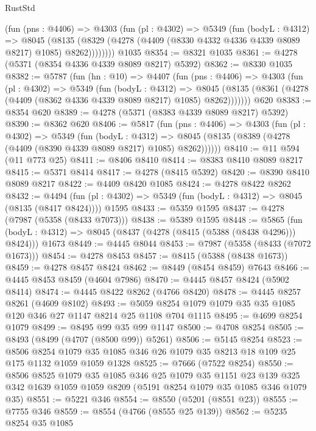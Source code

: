 \begin{lexlean}{RustStd}
\begin{coremodule}
{\begin{coremodule}
{{{{{{{{{{{{{{{{{{{{{{{{{{{{{{{{{{{        (fun (pns : @4406) =>
        @4303
          (fun (pl : @4302) =>
          @5349
            (fun (bodyL : @4312) =>
            @8045
              (@8135 (@8329 (@4278 (@4409 (@8330 @4332 @4336 @4339 @8089 @8217) @1085) @8262))))))))
    @1035
@8354 := @8321 @1035
@8361 := @4278 (@5371 (@8354 @4336 @4339 @8089 @8217) @5392)
@8362 := @8330 @1035
@8382 := @5787
    (fun (hn : @10) =>
    @4407
      (fun (pns : @4406) =>
      @4303
        (fun (pl : @4302) =>
        @5349
          (fun (bodyL : @4312) =>
          @8045 (@8135 (@8361 (@4278 (@4409 (@8362 @4336 @4339 @8089 @8217) @1085) @8262)))))))
    @620
@8383 := @8354 @620
@8389 := @4278 (@5371 (@8383 @4339 @8089 @8217) @5392)
@8390 := @8362 @620
@8406 := @5817
    (fun (pns : @4406) =>
    @4303
      (fun (pl : @4302) =>
      @5349
        (fun (bodyL : @4312) =>
        @8045 (@8135 (@8389 (@4278 (@4409 (@8390 @4339 @8089 @8217) @1085) @8262))))))
@8410 := @11 @594 (@11 @773 @25)
@8411 := @8406 @8410
@8414 := @8383 @8410 @8089 @8217
@8415 := @5371 @8414
@8417 := @4278 (@8415 @5392)
@8420 := @8390 @8410 @8089 @8217
@8422 := @4409 @8420 @1085
@8424 := @4278 @8422 @8262
@8432 := @4494
    (fun (pl : @4302) => @5349 (fun (bodyL : @4312) => @8045 (@8135 (@8417 @8424))))
    @1595
@8433 := @5359 @1595
@8437 := @4278 (@7987 (@5358 (@8433 @7073)))
@8438 := @5389 @1595
@8448 := @5865
    (fun (bodyL : @4312) => @8045 (@8437 (@4278 (@8415 (@5388 (@8438 @4296))) @8424)))
    @1673
@8449 := @4445 @8044
@8453 := @7987 (@5358 (@8433 (@7072 @1673)))
@8454 := @4278 @8453
@8457 := @8415 (@5388 (@8438 @1673))
@8459 := @4278 @8457 @8424
@8462 := @8449 (@8454 @8459) @7643
@8466 := @4445 @8453 @8459 (@4604 @7986)
@8470 := @4445 @8457 @8424 (@5902 @8414)
@8474 := @4445 @8422 @8262 (@4766 @8420)
@8478 := @4445 @8257 @8261 (@4609 @8102)
@8493 := @5059 @8254 @1079 @1079 @35 @35 @1085 @120 @346 @27 @1147 @8214 @25 @1108 @704 @1115
@8495 := @4699 @8254 @1079
@8499 := @8495 @99 @35 @99 @1147
@8500 := @4708 @8254
@8505 := @8493 (@8499 (@4707 (@8500 @99)) @5261)
@8506 := @5145 @8254
@8523 := @8506
    @8254
    @1079
    @35
    @1085
    @346
    @26
    @1079
    @35
    @8213
    @18
    @109
    @25
    @175
    @1132
    @1059
    @1059
    @1328
@8525 := @7666 (@7522 @8254)
@8550 := @8506
    @8525
    @1079
    @35
    @1085
    @346
    @25
    @1079
    @35
    @1151
    @23
    @139
    @325
    @342
    @1639
    @1059
    @1059
    @8209
    (@5191 @8254 @1079 @35 @1085 @346 @1079 @35)
@8551 := @5221 @346
@8554 := @8550 (@5201 (@8551 @23))
@8555 := @7755 @346
@8559 := @8554 (@4766 (@8555 @25 @139))
@8562 := @5235 @8254 @35 @1085
}}}}}}}}}}}}}}}}}}}}}}}}}}}}}}}}}}}
\end{coremodule}}
\end{coremodule}
\end{lexlean}

